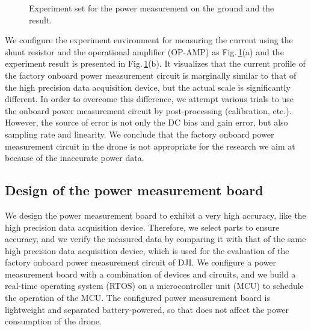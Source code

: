 \documentclass[journal]{./template/IEEEtran}
\begin{document}
\begin{figure}[ht]
\centering
{}
\qquad
{}
\caption{Experiment set for the power measurement on the ground and the result.}
\label{fig:Ground_test}
\end{figure}

We configure the experiment environment for measuring the current using the shunt resistor and the operational amplifier (OP-AMP) as Fig.\,\ref{fig:Ground_test}(a) and the experiment result is presented in Fig.\,\ref{fig:Ground_test}(b). 
It visualizes that the current profile of the factory onboard power measurement circuit is marginally similar to that of the high precision data acquisition device, but the actual scale is significantly different. 
In order to overcome this difference, we attempt various trials to use the onboard power measurement circuit by post-processing (calibration, etc.). 
However, the source of error is not only the DC bias and gain error, but also sampling rate and linearity. 
We conclude that the factory onboard power measurement circuit in the drone is not appropriate for the research we aim at because of the inaccurate power data.




\subsection{Design of the power measurement board}

We design the power measurement board to exhibit a very high accuracy, like the high precision data acquisition device.
Therefore, we select parts to ensure accuracy, and we verify the measured data by comparing it with that of the same high precision data acquisition device, which is used for the evaluation of the factory onboard power measurement circuit of DJI.
We configure a power measurement board with a combination of devices and circuits, and we build a real-time operating system (RTOS) on a microcontroller unit (MCU) to schedule the operation of the MCU. 
The configured power measurement board is lightweight and separated battery-powered, so that does not affect the power consumption of the drone.
\end{document}
